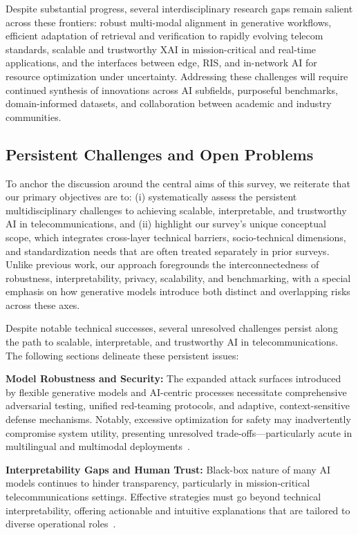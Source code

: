 \documentclass[sigconf]{acmart}
\begin{document}
Despite substantial progress, several interdisciplinary research gaps remain salient across these frontiers: robust multi-modal alignment in generative workflows, efficient adaptation of retrieval and verification to rapidly evolving telecom standards, scalable and trustworthy XAI in mission-critical and real-time applications, and the interfaces between edge, RIS, and in-network AI for resource optimization under uncertainty. Addressing these challenges will require continued synthesis of innovations across AI subfields, purposeful benchmarks, domain-informed datasets, and collaboration between academic and industry communities.

\subsection{Persistent Challenges and Open Problems}

To anchor the discussion around the central aims of this survey, we reiterate that our primary objectives are to: (i) systematically assess the persistent multidisciplinary challenges to achieving scalable, interpretable, and trustworthy AI in telecommunications, and (ii) highlight our survey's unique conceptual scope, which integrates cross-layer technical barriers, socio-technical dimensions, and standardization needs that are often treated separately in prior surveys. Unlike previous work, our approach foregrounds the interconnectedness of robustness, interpretability, privacy, scalability, and benchmarking, with a special emphasis on how generative models introduce both distinct and overlapping risks across these axes.

Despite notable technical successes, several unresolved challenges persist along the path to scalable, interpretable, and trustworthy AI in telecommunications. The following sections delineate these persistent issues:

\textbf{Model Robustness and Security:} The expanded attack surfaces introduced by flexible generative models and AI-centric processes necessitate comprehensive adversarial testing, unified red-teaming protocols, and adaptive, context-sensitive defense mechanisms. Notably, excessive optimization for safety may inadvertently compromise system utility, presenting unresolved trade-offs—particularly acute in multilingual and multimodal deployments~\cite{ref7, ref8, ref9, ref10, ref11, ref12}.

\textbf{Interpretability Gaps and Human Trust:} Black-box nature of many AI models continues to hinder transparency, particularly in mission-critical telecommunications settings. Effective strategies must go beyond technical interpretability, offering actionable and intuitive explanations that are tailored to diverse operational roles~\cite{ref43, ref44, ref45, ref46, ref47, ref48, ref49}.
\end{document}
